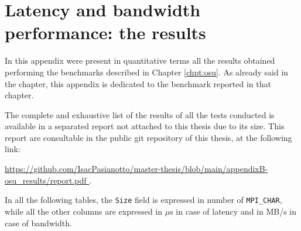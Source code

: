 \chapter{Latency and bandwidth performance: the results}\label{appendix:osu}

In this appendix were present in quantitative terms all the results obtained
performing the benchmarks described in Chapter \ref{chpt:osu}.
As already said in the chapter, this appendix is dedicated to the benchmark
reported in that chapter.

The complete and exhaustive list of the results of all the tests conducted is
available in a separated report not attached to this thesis due to its size.
This report are consultable in the public git repository of this thesis, at the
following link:

\begin{center}
  \small
  \url{
    https://github.com/IsacPasianotto/master-thesis/blob/main/appendixB-osu_results/report.pdf
  }.
\end{center}



In all the following tables, the \texttt{Size} field is expressed in number of
\texttt{MPI\_CHAR}, while all the other columns are expressed in $\mu$s in case
of latency and in MB/s in case of bandwidth.




